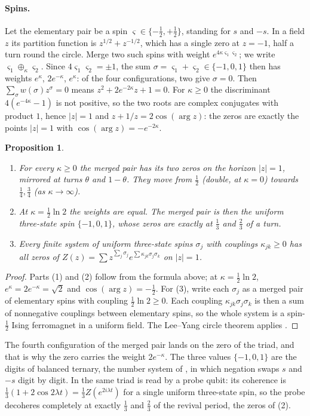 \documentclass[11pt]{article}
\newtheorem{proposition}[theorem]{Proposition}
\theoremstyle{definition}\newtheorem{definition}[theorem]{Definition}
\theoremstyle{remark}\newtheorem{remark}[theorem]{Remark}
\begin{document}
\paragraph{Spins.} Let the elementary pair be a spin $\varsigma\in\{-\tfrac12,+\tfrac12\}$, standing for $s$ and $-s$. In a field $z$ its partition function is $z^{1/2}+z^{-1/2}$, which has a single zero at $z=-1$, half a turn round the circle. Merge two such spins with weight $e^{4\kappa\varsigma_1\varsigma_2}$; we write $\varsigma_1\oplus_\kappa\varsigma_2$. Since $4\varsigma_1\varsigma_2=\pm1$, the sum $\sigma=\varsigma_1+\varsigma_2\in\{-1,0,1\}$ then has weights $e^\kappa$, $2e^{-\kappa}$, $e^\kappa$: of the four configurations, two give $\sigma=0$. Then $\sum_\sigma w(\sigma)z^\sigma=0$ means $z^2+2e^{-2\kappa}z+1=0$. For $\kappa\ge0$ the discriminant $4(e^{-4\kappa}-1)$ is not positive, so the two roots are complex conjugates with product $1$, hence $|z|=1$ and $z+1/z=2\cos(\arg z)$: the zeros are exactly the points $|z|=1$ with $\cos(\arg z)=-e^{-2\kappa}$.
\begin{proposition}\label{prop:spin}
\begin{enumerate}
\item For every $\kappa\ge0$ the merged pair has its two zeros on the horizon $|z|=1$, mirrored at turns $\theta$ and $1-\theta$. They move from $\tfrac12$ (double, at $\kappa=0$) towards $\tfrac14,\tfrac34$ (as $\kappa\to\infty$).
\item At $\kappa=\tfrac12\ln2$ the weights are equal. The merged pair is then the uniform three-state spin $\{-1,0,1\}$, whose zeros are exactly at $\tfrac13$ and $\tfrac23$ of a turn.
\item Every finite system of uniform three-state spins $\sigma_j$ with couplings $\kappa_{jk}\ge0$ has all zeros of $Z(z)=\sum z^{\sum_j\sigma_j}e^{\sum\kappa_{jk}\sigma_j\sigma_k}$ on $|z|=1$.
\end{enumerate}
\end{proposition}
\begin{proof}
Parts (1) and (2) follow from the formula above; at $\kappa=\frac12\ln2$, $e^{\kappa}=2e^{-\kappa}=\sqrt2$ and $\cos(\arg z)=-\frac12$. For (3), write each $\sigma_j$ as a merged pair of elementary spins with coupling $\tfrac12\ln2\ge0$. Each coupling $\kappa_{jk}\sigma_j\sigma_k$ is then a sum of nonnegative couplings between elementary spins, so the whole system is a spin-$\tfrac12$ Ising ferromagnet in a uniform field. The Lee--Yang circle theorem applies \cite{LeeYang,Griffiths69}.
\end{proof}
The fourth configuration of the merged pair lands on the zero of the triad, and that is why the zero carries the weight $2e^{-\kappa}$. The three values $\{-1,0,1\}$ are the digits of balanced ternary, the number system of \cite{SAlg}, in which negation swaps $s$ and $-s$ digit by digit. In \cite{SQuant} the same triad is read by a probe qubit: its coherence is $\frac13(1+2\cos2\lambda t)=\frac13Z(e^{2i\lambda t})$ for a single uniform three-state spin, so the probe decoheres completely at exactly $\frac13$ and $\frac23$ of the revival period, the zeros of (2).
\end{document}
